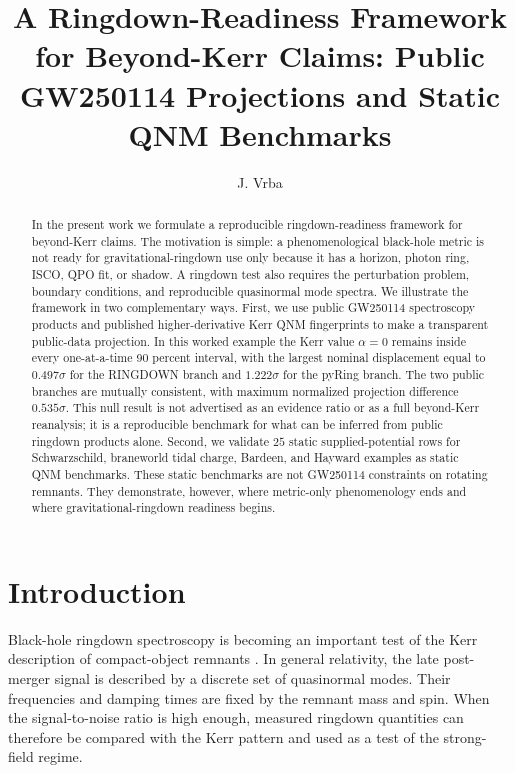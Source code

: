 \documentclass[aps,prd,10pt,twocolumn,nofootinbib,superscriptaddress]{revtex4-2}
\begin{document}
\title{A Ringdown-Readiness Framework for Beyond-Kerr Claims: Public GW250114 Projections and Static QNM Benchmarks}
\author{J. Vrba}


\begin{abstract}

In the present work we formulate a reproducible ringdown-readiness framework
for beyond-Kerr claims. The motivation is simple: a phenomenological black-hole
metric is not ready for gravitational-ringdown use only because it has a
horizon, photon ring, ISCO, QPO fit, or shadow. A ringdown test also requires
the perturbation problem, boundary conditions, and reproducible quasinormal
mode spectra. We illustrate the framework in two complementary ways. First, we
use public GW250114 spectroscopy products and published higher-derivative Kerr
QNM fingerprints to make a transparent public-data projection. In this worked
example the Kerr value $\alpha=0$ remains inside every one-at-a-time 90
percent interval, with the largest nominal displacement equal to $0.497\sigma$
for the RINGDOWN branch and $1.222\sigma$ for the pyRing branch. The two public
branches are mutually consistent, with maximum normalized projection
difference $0.535\sigma$. This null result is not advertised as an evidence
ratio or as a full beyond-Kerr reanalysis; it is a reproducible benchmark for
what can be inferred from public ringdown products alone. Second, we validate
$25$ static supplied-potential rows for Schwarzschild, braneworld tidal charge,
Bardeen, and Hayward examples as static QNM benchmarks. These static benchmarks
are not GW250114 constraints on rotating remnants. They demonstrate, however,
where metric-only phenomenology ends and where gravitational-ringdown readiness
begins.

\end{abstract}
\maketitle
\section{Introduction}

Black-hole ringdown spectroscopy is becoming an important test of the Kerr
description of compact-object remnants \cite{Ber-Car-Sta:2009:CQG:,Isi-Gie-Far:2019:PRL:,Gho-Bri-Buo:2021:PRD:}.
In general relativity, the late post-merger signal is described by a discrete
set of quasinormal modes. Their frequencies and damping times are fixed by the
remnant mass and spin. When the signal-to-noise ratio is high enough, measured
ringdown quantities can therefore be compared with the Kerr pattern and used
as a test of the strong-field regime.
\end{document}
